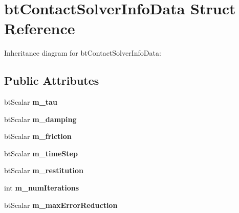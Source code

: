 \hypertarget{structbt_contact_solver_info_data}{\section{bt\+Contact\+Solver\+Info\+Data Struct Reference}
\label{structbt_contact_solver_info_data}
}


Inheritance diagram for bt\+Contact\+Solver\+Info\+Data\+:
\subsection*{Public Attributes}
\begin{DoxyCompactItemize}
\item 
\hypertarget{structbt_contact_solver_info_data_abc39f35a202d431897b7c88902aba3b7}{bt\+Scalar {\bfseries m\+\_\+tau}}\label{structbt_contact_solver_info_data_abc39f35a202d431897b7c88902aba3b7}

\item 
\hypertarget{structbt_contact_solver_info_data_a06bc266a8913379c544dc51426bb1c62}{bt\+Scalar {\bfseries m\+\_\+damping}}\label{structbt_contact_solver_info_data_a06bc266a8913379c544dc51426bb1c62}

\item 
\hypertarget{structbt_contact_solver_info_data_a0eec68f61183f96cacc304361b044527}{bt\+Scalar {\bfseries m\+\_\+friction}}\label{structbt_contact_solver_info_data_a0eec68f61183f96cacc304361b044527}

\item 
\hypertarget{structbt_contact_solver_info_data_ad22b724d878c1f9452523cc22913dc73}{bt\+Scalar {\bfseries m\+\_\+time\+Step}}\label{structbt_contact_solver_info_data_ad22b724d878c1f9452523cc22913dc73}

\item 
\hypertarget{structbt_contact_solver_info_data_a92766759b2226b4f54aadd26022be2de}{bt\+Scalar {\bfseries m\+\_\+restitution}}\label{structbt_contact_solver_info_data_a92766759b2226b4f54aadd26022be2de}

\item 
\hypertarget{structbt_contact_solver_info_data_a1a58eba446912013cd04deecfe5f840a}{int {\bfseries m\+\_\+num\+Iterations}}\label{structbt_contact_solver_info_data_a1a58eba446912013cd04deecfe5f840a}

\item 
\hypertarget{structbt_contact_solver_info_data_a2595a4685ee4aba6ed6a695e284921bb}{bt\+Scalar {\bfseries m\+\_\+max\+Error\+Reduction}}\label{structbt_contact_solver_info_data_a2595a4685ee4aba6ed6a695e284921bb}


\end{DoxyCompactItemize}
